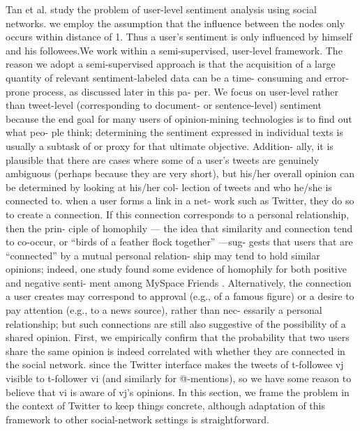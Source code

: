\documentclass[twocolumn]{svjour3}          %
\begin{document}
Tan et al. \cite{tan2011user} study the problem of user-level sentiment analysis using social networks. we employ the assumption that the influence between the nodes only occurs within distance of 1. Thus a user’s sentiment is only influenced by himself and his followees.We work within a semi-supervised, user-level framework. The
reason we adopt a semi-supervised approach is that the acquisition of a large quantity of relevant sentiment-labeled data can be a time- consuming and error-prone process, as discussed later in this pa- per. We focus on user-level rather than tweet-level (corresponding to document- or sentence-level) sentiment because the end goal for many users of opinion-mining technologies is to find out what peo- ple think; determining the sentiment expressed in individual texts is usually a subtask of or proxy for that ultimate objective. Addition- ally, it is plausible that there are cases where some of a user’s tweets are genuinely ambiguous (perhaps because they are very short), but his/her overall opinion can be determined by looking at his/her col- lection of tweets and who he/she is connected to. 
when a user forms a link in a net- work such as Twitter, they do so to create a connection. If this connection corresponds to a personal relationship, then the prin- ciple of homophily \cite{lazarsfeld_friendship_1954} — the idea that similarity and connection tend to co-occur, or “birds of a feather flock together” \cite{mcpherson2001birds}—sug- gests that users that are “connected” by a mutual personal relation- ship may tend to hold similar opinions; indeed, one study found some evidence of homophily for both positive and negative senti- ment among MySpace Friends \cite{thelwall2010emotion}. Alternatively, the connection a user creates may correspond to approval (e.g., of a famous figure) or a desire to pay attention (e.g., to a news source), rather than nec- essarily a personal relationship; but such connections are still also suggestive of the possibility of a shared opinion.
First, we empirically confirm that the probability that two users share the same opinion is indeed correlated with whether they are connected in the social network.
since the Twitter
interface makes the tweets of t-followee vj visible to t-follower vi (and similarly for @-mentions), so we have some reason to believe that vi is aware of vj’s opinions.
In this section, we frame the problem in the context of Twitter to keep things concrete, although adaptation of this framework to other social-network settings is straightforward.\cite{tan2011user}
\end{document}
